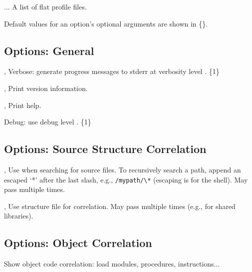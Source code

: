 \documentclass[english]{article}
\begin{document}
\begin{Description}
\item[\Arg{profile-file}...] A list of flat profile files.
\end{Description}

Default values for an option's optional arguments are shown in \{\}.

\subsection{Options: General}

\begin{Description}
\item[\OptoArg{-v}{n}, \OptoArg{--verbose}{n}] Verbose: generate progress messages to stderr at verbosity level .  \{1\} 
\item[\Opt{-V}, \Opt{--version}] Print version information.
\item[\Opt{-h}, \Opt{--help}] Print help.
\item[\OptoArg{--debug}{n}]   Debug: use debug level . \{1\}
\end{Description}

\subsection{Options: Source Structure Correlation}

\begin{Description}
\item[\OptArg{-I}{path}, \OptArg{--include}{path}] Use  when searching for source files. To recursively search a path, append an escaped `*' after the last slash, e.g., \verb+/mypath/\*+ (escaping is for the shell). May pass multiple times.
\item[\OptArg{-S}{file}, \OptArg{--structure}{file}] Use  structure file  for correlation.  May pass multiple times (e.g., for shared libraries).
\end{Description}

\subsection{Options: Object Correlation}

\begin{Description}
\item[\OptArg{--object}{...}] Show object code correlation: load modules, procedures, instructions...
\end{Description}
\end{document}
